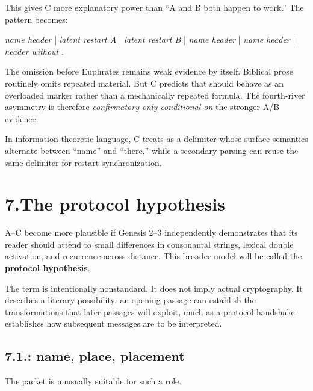 This gives C more explanatory power than ``A and B both happen to work.''  The pattern becomes:

\begin{center}
\textit{name header} \;|\; \textit{latent restart A} \;|\; \textit{latent restart B} \;|\; \textit{name header} \;|\; \textit{name header} \;|\; \textit{header without }.
\end{center}

The omission before Euphrates remains weak evidence by itself.  Biblical prose routinely omits repeated material.  But C predicts that  should behave as an overloaded marker rather than a mechanically repeated formula.  The fourth-river asymmetry is therefore \emph{confirmatory only conditional on} the stronger A/B evidence.

In information-theoretic language, C treats  as a delimiter whose surface semantics alternate between ``name'' and ``there,'' while a secondary parsing can reuse the same delimiter for restart synchronization.

\section*{7.\quad The protocol hypothesis}

A--C become more plausible if Genesis 2--3 independently demonstrates that its reader should attend to small differences in consonantal strings, lexical double activation, and recurrence across distance.  This broader model will be called the \textbf{protocol hypothesis}.

The term is intentionally nonstandard.  It does not imply actual cryptography.  It describes a literary possibility: an opening passage can establish the transformations that later passages will exploit, much as a protocol handshake establishes how subsequent messages are to be interpreted.

\subsection*{7.1.\quad {}: name, place, placement}

The packet  is unusually suitable for such a role.


